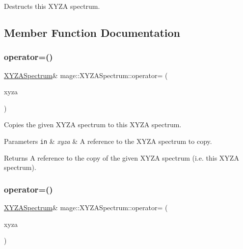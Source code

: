 Destructs this X\+Y\+ZA spectrum. 

\subsection{Member Function Documentation}
\hypertarget{structmage_1_1_x_y_z_a_spectrum_a19cd04808e18b2791307195c54846988}{}\label{structmage_1_1_x_y_z_a_spectrum_a19cd04808e18b2791307195c54846988} 
\subsubsection{\texorpdfstring{operator=()}{operator=()}\hspace{0.1cm}{\footnotesize\ttfamily [1/2]}}
{\footnotesize\ttfamily \hyperlink{structmage_1_1_x_y_z_a_spectrum}{X\+Y\+Z\+A\+Spectrum}\& mage\+::\+X\+Y\+Z\+A\+Spectrum\+::operator= (\begin{DoxyParamCaption}\item[{const \hyperlink{structmage_1_1_x_y_z_a_spectrum}{X\+Y\+Z\+A\+Spectrum} \&}]{xyza }\end{DoxyParamCaption})\hspace{0.3cm}{\ttfamily [default]}}

Copies the given X\+Y\+ZA spectrum to this X\+Y\+ZA spectrum.


\begin{DoxyParams}[1]{Parameters}
\mbox{\tt in}  & {\em xyza} & A reference to the X\+Y\+ZA spectrum to copy. \\
\hline
\end{DoxyParams}
\begin{DoxyReturn}{Returns}
A reference to the copy of the given X\+Y\+ZA spectrum (i.\+e. this X\+Y\+ZA spectrum). 
\end{DoxyReturn}
\hypertarget{structmage_1_1_x_y_z_a_spectrum_a7afaa89a90d8444691b74c1f4b257aec}{}\label{structmage_1_1_x_y_z_a_spectrum_a7afaa89a90d8444691b74c1f4b257aec} 
\subsubsection{\texorpdfstring{operator=()}{operator=()}\hspace{0.1cm}{\footnotesize\ttfamily [2/2]}}
{\footnotesize\ttfamily \hyperlink{structmage_1_1_x_y_z_a_spectrum}{X\+Y\+Z\+A\+Spectrum}\& mage\+::\+X\+Y\+Z\+A\+Spectrum\+::operator= (\begin{DoxyParamCaption}\item[{\hyperlink{structmage_1_1_x_y_z_a_spectrum}{X\+Y\+Z\+A\+Spectrum} \&\&}]{xyza }\end{DoxyParamCaption})\hspace{0.3cm}{\ttfamily [default]}}

